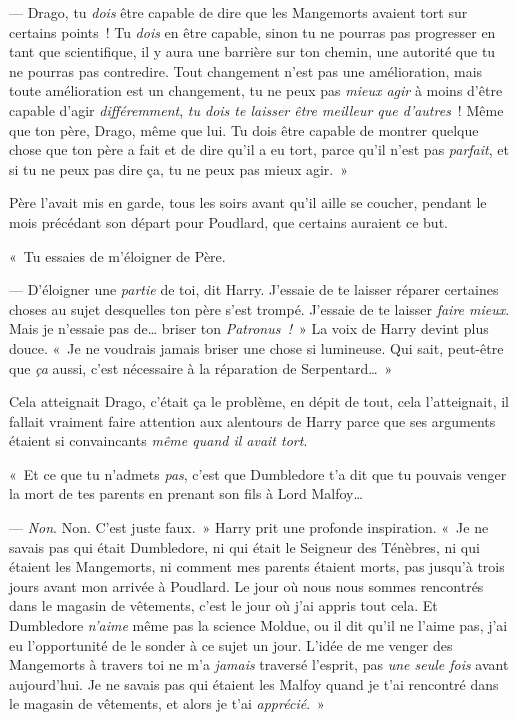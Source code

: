 --- Drago, tu \emph{dois} être capable de dire que les Mangemorts avaient tort sur certains points~!
Tu \emph{dois} en être capable, sinon tu ne pourras pas progresser en tant que scientifique, il y aura une barrière sur ton chemin, une autorité que tu ne pourras pas contredire.
Tout changement n'est pas une amélioration, mais toute amélioration est un changement, tu ne peux pas \emph{mieux agir} à moins d'être capable d'agir \emph{différemment}, \emph{tu dois te laisser être meilleur que d'autres}~!
Même que ton père, Drago, même que lui.
Tu dois être capable de montrer quelque chose que ton père a fait et de dire qu'il a eu tort, parce qu'il n'est pas \emph{parfait}, et si tu ne peux pas dire ça, tu ne peux pas mieux agir.~»

Père l'avait mis en garde, tous les soirs avant qu'il aille se coucher, pendant le mois précédant son départ pour Poudlard, que certains auraient ce but.

«~Tu essaies de m'éloigner de Père.

--- D'éloigner une \emph{partie} de toi, dit Harry.
J'essaie de te laisser réparer certaines choses au sujet desquelles ton père s'est trompé.
J'essaie de te laisser \emph{faire mieux}.
Mais je n'essaie pas de… briser ton \emph{Patronus~!}~» La voix de Harry devint plus douce.
«~Je ne voudrais jamais briser une chose si lumineuse.
Qui sait, peut-être que \emph{ça} aussi, c'est nécessaire à la réparation de Serpentard…~»

Cela atteignait Drago, c'était ça le problème, en dépit de tout, cela l'atteignait, il fallait vraiment faire attention aux alentours de Harry parce que ses arguments étaient si convaincants \emph{même quand il avait tort}.

«~Et ce que tu n'admets \emph{pas}, c'est que Dumbledore t'a dit que tu pouvais venger la mort de tes parents en prenant son fils à Lord Malfoy…

--- \emph{Non}.
Non. C'est juste faux.~»
Harry prit une profonde inspiration.
«~Je ne savais pas qui était Dumbledore, ni qui était le Seigneur des Ténèbres, ni qui étaient les Mangemorts, ni comment mes parents étaient morts, pas jusqu'à trois jours avant mon arrivée à Poudlard.
Le jour où nous nous sommes rencontrés dans le magasin de vêtements, c'est le jour où j'ai appris tout cela.
Et Dumbledore \emph{n'aime} même pas la science Moldue, ou il dit qu'il ne l'aime pas, j'ai eu l'opportunité de le sonder à ce sujet un jour.
L'idée de me venger des Mangemorts à travers toi ne m'a \emph{jamais} traversé l'esprit, pas \emph{une seule fois} avant aujourd'hui.
Je ne savais pas qui étaient les Malfoy quand je t'ai rencontré dans le magasin de vêtements, et alors je t'ai \emph{apprécié}.~»

